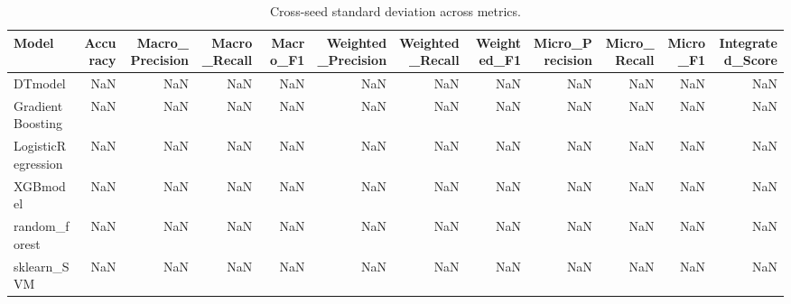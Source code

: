 \begin{table}[t]
\centering
\begin{tabular}{lrrrrrrrrrrr}
\toprule
Model & Accuracy & Macro_Precision & Macro_Recall & Macro_F1 & Weighted_Precision & Weighted_Recall & Weighted_F1 & Micro_Precision & Micro_Recall & Micro_F1 & Integrated_Score \\
\midrule
DTmodel & NaN & NaN & NaN & NaN & NaN & NaN & NaN & NaN & NaN & NaN & NaN \\
GradientBoosting & NaN & NaN & NaN & NaN & NaN & NaN & NaN & NaN & NaN & NaN & NaN \\
LogisticRegression & NaN & NaN & NaN & NaN & NaN & NaN & NaN & NaN & NaN & NaN & NaN \\
XGBmodel & NaN & NaN & NaN & NaN & NaN & NaN & NaN & NaN & NaN & NaN & NaN \\
random_forest & NaN & NaN & NaN & NaN & NaN & NaN & NaN & NaN & NaN & NaN & NaN \\
sklearn_SVM & NaN & NaN & NaN & NaN & NaN & NaN & NaN & NaN & NaN & NaN & NaN \\
\bottomrule
\end{tabular}
\caption{Cross-seed standard deviation across metrics.}
\label{tab:cross_seed_std}
\end{table}